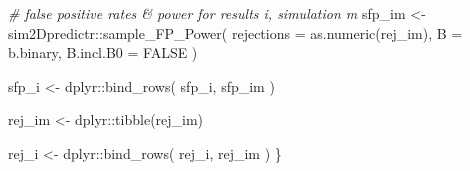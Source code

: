 \documentclass[
]{article}
\newenvironment{Shaded}{\begin{snugshade}}{\end{snugshade}}
\newcommand{\AttributeTok}[1]{\textcolor[rgb]{0.77,0.63,0.00}{#1}}
\newcommand{\CommentTok}[1]{\textcolor[rgb]{0.56,0.35,0.01}{\textit{#1}}}
\newcommand{\ConstantTok}[1]{\textcolor[rgb]{0.00,0.00,0.00}{#1}}
\newcommand{\FunctionTok}[1]{\textcolor[rgb]{0.00,0.00,0.00}{#1}}
\newcommand{\NormalTok}[1]{#1}
\newcommand{\OtherTok}[1]{\textcolor[rgb]{0.56,0.35,0.01}{#1}}
\newcommand{\SpecialCharTok}[1]{\textcolor[rgb]{0.00,0.00,0.00}{#1}}
\begin{document}
\begin{Shaded}
\begin{Highlighting}[]
        \CommentTok{\# false positive rates \& power for results i, simulation m}
\NormalTok{        sfp\_im }\OtherTok{\textless{}{-}}\NormalTok{ sim2Dpredictr}\SpecialCharTok{::}\FunctionTok{sample\_FP\_Power}\NormalTok{(}
          \AttributeTok{rejections =} \FunctionTok{as.numeric}\NormalTok{(rej\_im),}
          \AttributeTok{B =}\NormalTok{ b.binary,}
          \AttributeTok{B.incl.B0 =} \ConstantTok{FALSE}
\NormalTok{        )}
        
\NormalTok{        sfp\_i }\OtherTok{\textless{}{-}}\NormalTok{ dplyr}\SpecialCharTok{::}\FunctionTok{bind\_rows}\NormalTok{(}
\NormalTok{          sfp\_i,}
\NormalTok{          sfp\_im}
\NormalTok{        )}
        
\NormalTok{        rej\_im }\OtherTok{\textless{}{-}}\NormalTok{ dplyr}\SpecialCharTok{::}\FunctionTok{tibble}\NormalTok{(rej\_im)}
        
\NormalTok{        rej\_i }\OtherTok{\textless{}{-}}\NormalTok{ dplyr}\SpecialCharTok{::}\FunctionTok{bind\_rows}\NormalTok{(}
\NormalTok{          rej\_i,}
\NormalTok{          rej\_im}
\NormalTok{        )}
\NormalTok{      \}}
      

\end{Highlighting}
\end{Shaded}
\end{document}

